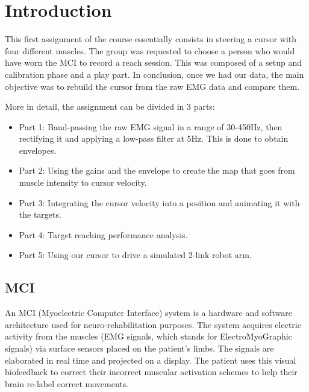 \section*{Introduction}

This first assignment of the course essentially consists in steering a cursor with four different muscles. The group was requested to choose a person who would have worn the MCI to record a reach session. This was composed of a setup and calibration phase and a play part. In conclusion, once we had our data, the main objective was to rebuild the cursor from the raw EMG data and compare them.

More in detail, the assignment can be divided in 3 parts: 
\begin{itemize}
    \item Part 1: Band-passing the raw EMG signal in a range of 30-450Hz, then rectifying it and applying a low-pass filter at 5Hz. This is done to obtain envelopes.
    \item Part 2: Using the gains and the envelope to create the map that goes from muscle intensity to cursor velocity.
    \item Part 3: Integrating the cursor velocity into a position and animating it with the targets.
    \item Part 4: Target reaching performance analysis.
    \item Part 5: Using our cursor to drive a simulated 2-link robot arm.
\end{itemize}

\subsection*{MCI}
An MCI (Myoelectric Computer Interface) system is a hardware and software architecture used for neuro-rehabilitation purposes. The system acquires electric activity from the muscles (EMG signals, which stands for ElectroMyoGraphic signals) via surface sensors placed on the patient's limbs.
The signals are elaborated in real time and projected on a display. The patient uses this visual biofeedback to correct their incorrect muscular activation schemes to help their brain re-label correct movements. 



